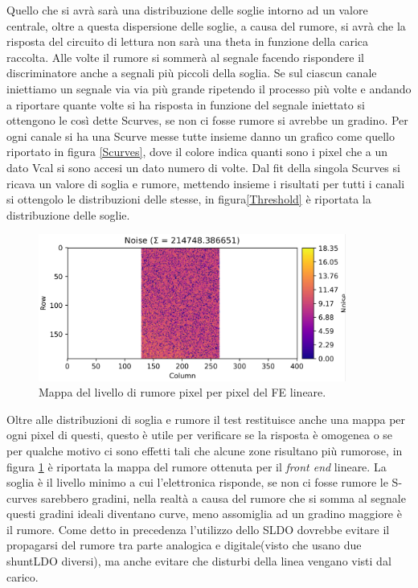 Quello che si avrà sarà una distribuzione delle soglie intorno ad un valore centrale, oltre a questa dispersione delle soglie, a causa del rumore, si avrà che la risposta del circuito di lettura non sarà una theta in funzione della carica raccolta. 
Alle volte il rumore si sommerà al segnale facendo rispondere il discriminatore anche a segnali più piccoli della soglia. Se sul ciascun canale iniettiamo un segnale via via più grande ripetendo il processo più volte e andando a riportare quante volte si ha risposta in funzione del segnale iniettato si ottengono le così dette Scurves, se non ci fosse rumore si avrebbe un gradino. 
Per ogni canale si ha una Scurve messe tutte insieme danno un grafico come quello riportato in figura \ref{Scurves}, dove il colore indica quanti sono i pixel che a un dato Vcal si sono accesi un dato numero di volte. Dal fit della singola Scurves si ricava un valore di soglia e rumore, mettendo insieme i risultati per tutti i canali si ottengolo le distribuzioni delle stesse, in figura\ref{Threshold} è riportata la distribuzione delle soglie. 
\begin{figure}
\centering
\includegraphics[width=0.9\textwidth]{Immagini/NoiseMap}
\caption{Mappa del livello di rumore pixel per pixel del FE lineare.}
\label{NoiseMap}
\end{figure}
Oltre alle distribuzioni di soglia e rumore il test restituisce anche una mappa per ogni pixel di questi, questo è utile per verificare se la risposta è omogenea o se per qualche motivo ci sono effetti tali che alcune zone risultano più rumorose, in figura \ref{NoiseMap} è riportata la mappa del rumore ottenuta per il \textit{front end} lineare. 
La soglia è il livello minimo a cui l'elettronica risponde, se non ci fosse rumore le S-curves sarebbero gradini, nella realtà a causa del rumore che si somma al segnale questi gradini ideali diventano curve, meno assomiglia ad un gradino maggiore è il rumore.
Come detto in precedenza l'utilizzo dello SLDO dovrebbe evitare il propagarsi del rumore tra parte analogica e digitale(visto che usano due shuntLDO diversi), ma anche evitare che disturbi della linea vengano visti dal carico. 
